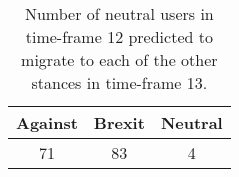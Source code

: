 %
\begin{table}[htp]
\centering
\caption{Number of neutral users in time-frame 12 predicted to migrate to each of the other stances in time-frame 13.
}
\label{fig:table_story}
\begin{tabular}{ccc}
\toprule
\textbf{Against} & \textbf{Brexit} & \textbf{Neutral} \\ \midrule
71& 83 & 4 \\ \bottomrule
\end{tabular}
\end{table}